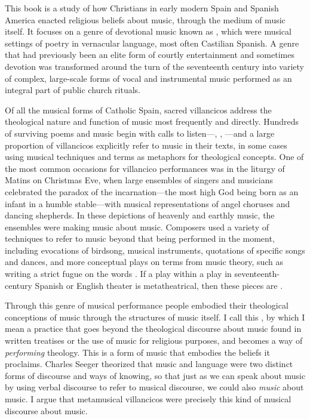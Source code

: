 This book is a study of how Christians in early modern Spain and Spanish
America enacted religious beliefs about music, through the medium of music
itself.
It focuses on a genre of devotional music known as , which
were musical settings of poetry in vernacular language, most often Castilian
Spanish.
A genre that had previously been an elite form of courtly entertainment and
sometimes devotion was transformed around the turn of the seventeenth century
into variety of complex, large-scale forms of vocal and instrumental music
performed as an integral part of public church rituals.%
    \Autocites
    {Torrente:VC-chapter}
    {Laird:VC}
    {Knighton-Torrente:VCs}
    {Borrego-Marin:Villancico}
    {Illari:Polychoral}
    {CaberoPueyo:PhD}
    {Swadley:VillancicoPhD}
    {ChavezBarcenas:PhD}

Of all the musical forms of Catholic Spain, sacred villancicos address the
theological nature and function of music most frequently and directly.
Hundreds of surviving poems and music begin with calls to
listen---, , ---and a large
proportion of villancicos explicitly refer to music in their texts, in some
cases using musical techniques and terms as metaphors for theological concepts.
One of the most common occasions for villancico performances was in the liturgy
of Matins on Christmas Eve, when large ensembles of singers and musicians
celebrated the paradox of the incarnation---the most high God being born
as an infant in a humble stable---with musical representations of
angel choruses and dancing shepherds.
In these depictions of heavenly and earthly music, the ensembles were making
music about music.
Composers used a variety of techniques to refer to music beyond that being
performed in the moment, including evocations of birdsong, musical instruments,
quotations of specific songs and dances, and more conceptual plays on terms
from music theory, such as writing a strict fugue on the words
.
If a play within a play in seventeenth-century Spanish or English theater is
metatheatrical, then these pieces are .

Through this genre of musical performance people embodied their theological
conceptions of music through the structures of music itself.
I call this , by which I mean a practice that goes
beyond the theological discourse about music found in written treatises or the
use of music for religious purposes, and becomes a way of \emph{performing}
theology.
This is a form of music that embodies the beliefs it proclaims.
Charles Seeger theorized that music and language were two distinct forms of
discourse and ways of knowing, so that just as we can speak about music by
using verbal discourse to refer to musical discourse, we could also
\emph{music} about music.%
    \Autocites
    {Seeger:Unitary}
    {Small:Musicking}
I argue that metamusical villancicos were precisely this kind of musical
discourse about music.

